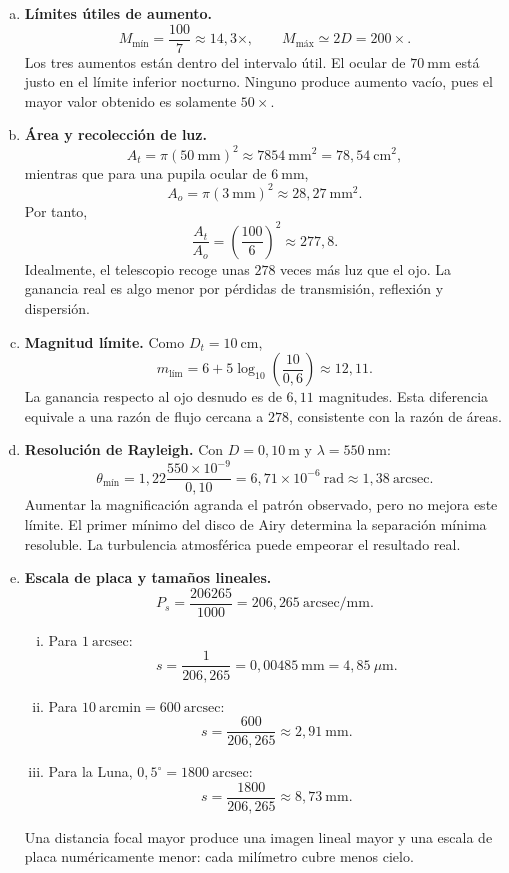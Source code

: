 \begin{enumerate}[a)]
    

    \item \textbf{Límites útiles de aumento.}
    \[
        M_{\text{mín}}=\frac{100}{7}\approx14{,}3\times,
        \qquad
        M_{\text{máx}}\simeq2D=200\times.
    \]
    Los tres aumentos están dentro del intervalo útil. El ocular de
    $70~\text{mm}$ está justo en el límite inferior nocturno. Ninguno produce
    aumento vacío, pues el mayor valor obtenido es solamente $50\times$.

    \item \textbf{Área y recolección de luz.}
    \[
        A_t=\pi(50~\text{mm})^2
        \approx7854~\text{mm}^2=78{,}54~\text{cm}^2,
    \]
    mientras que para una pupila ocular de $6~\text{mm}$,
    \[
        A_o=\pi(3~\text{mm})^2\approx28{,}27~\text{mm}^2.
    \]
    Por tanto,
    \[
        \frac{A_t}{A_o}
        =\left(\frac{100}{6}\right)^2
        \approx277{,}8.
    \]
    Idealmente, el telescopio recoge unas $278$ veces más luz que el ojo. La
    ganancia real es algo menor por pérdidas de transmisión, reflexión y
    dispersión.

    \item \textbf{Magnitud límite.}
    Como $D_t=10~\text{cm}$,
    \[
        m_{\text{lím}}
        =6+5\log_{10}\left(\frac{10}{0{,}6}\right)
        \approx12{,}11.
    \]
    La ganancia respecto al ojo desnudo es de $6{,}11$ magnitudes. Esta
    diferencia equivale a una razón de flujo cercana a $278$, consistente con
    la razón de áreas.

    \item \textbf{Resolución de Rayleigh.}
    Con $D=0{,}10~\text{m}$ y $\lambda=550~\text{nm}$:
    \[
        \theta_{\text{mín}}
        =1{,}22\frac{550\times10^{-9}}{0{,}10}
        =6{,}71\times10^{-6}~\text{rad}
        \approx1{,}38~\text{arcsec}.
    \]
    Aumentar la magnificación agranda el patrón observado, pero no mejora este
    límite. El primer mínimo del disco de Airy determina la separación mínima
    resoluble. La turbulencia atmosférica puede empeorar el resultado real.

    \item \textbf{Escala de placa y tamaños lineales.}
    \[
        P_s=\frac{206265}{1000}
        =206{,}265~\text{arcsec/mm}.
    \]
    \begin{enumerate}[i)]
        \item Para $1~\text{arcsec}$:
        \[
            s=\frac{1}{206{,}265}
            =0{,}00485~\text{mm}=4{,}85~\mu\text{m}.
        \]
        \item Para $10~\text{arcmin}=600~\text{arcsec}$:
        \[
            s=\frac{600}{206{,}265}\approx2{,}91~\text{mm}.
        \]
        \item Para la Luna, $0{,}5^\circ=1800~\text{arcsec}$:
        \[
            s=\frac{1800}{206{,}265}\approx8{,}73~\text{mm}.
        \]
    \end{enumerate}
    Una distancia focal mayor produce una imagen lineal mayor y una escala de
    placa numéricamente menor: cada milímetro cubre menos cielo.


\end{enumerate}
